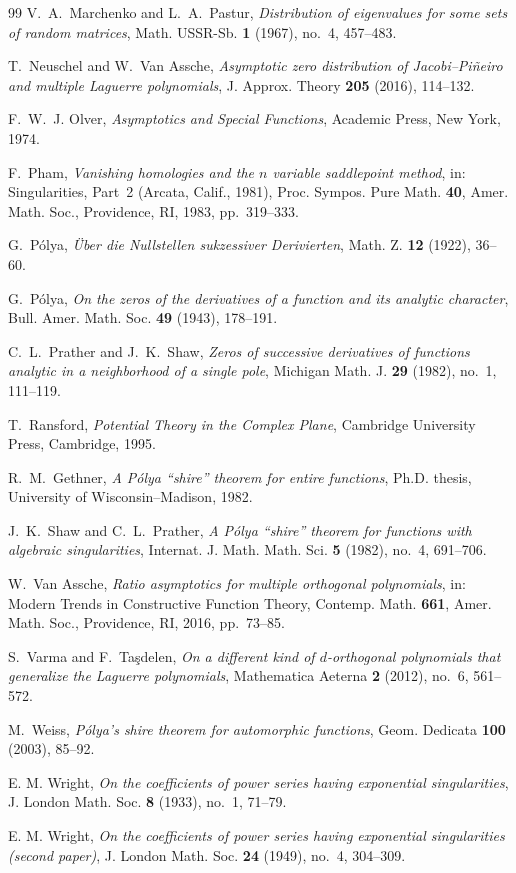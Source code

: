 \documentclass[reqno]{article}
\theoremstyle{definition}
\theoremstyle{remark}
\theoremstyle{plain}
\begin{document}
\begin{thebibliography}{99}
V.~A.~Marchenko and L.~A.~Pastur,
\emph{Distribution of eigenvalues for some sets of random matrices},
Math. USSR-Sb. \textbf{1} (1967), no.~4, 457--483.

T.~Neuschel and W.~Van Assche,
\emph{Asymptotic zero distribution of Jacobi--Pi\~neiro and multiple Laguerre polynomials},
J. Approx. Theory \textbf{205} (2016), 114--132.

F.~W.~J. Olver,
\emph{Asymptotics and Special Functions},
Academic Press, New York, 1974.

F.~Pham,
\emph{Vanishing homologies and the $n$ variable saddlepoint method},
in: Singularities, Part~2 (Arcata, Calif., 1981),
Proc. Sympos. Pure Math. \textbf{40}, Amer. Math. Soc., Providence, RI, 1983, pp.~319--333.

G.~P\'olya,
\emph{\"Uber die Nullstellen sukzessiver Derivierten},
Math. Z. \textbf{12} (1922), 36--60.

G.~P\'olya,
\emph{On the zeros of the derivatives of a function and its analytic character},
Bull. Amer. Math. Soc. \textbf{49} (1943), 178--191.

C.~L.~Prather and J.~K.~Shaw,
\emph{Zeros of successive derivatives of functions analytic in a neighborhood of a single pole},
Michigan Math. J. \textbf{29} (1982), no.~1, 111--119.

T.~Ransford,
\emph{Potential Theory in the Complex Plane},
Cambridge University Press, Cambridge, 1995.

R.~M.~Gethner,
\emph{A P\'olya ``shire'' theorem for entire functions},
Ph.D. thesis, University of Wisconsin--Madison, 1982.

J.~K.~Shaw and C.~L.~Prather,
\emph{A P\'olya ``shire'' theorem for functions with algebraic singularities},
Internat. J. Math. Math. Sci. \textbf{5} (1982), no.~4, 691--706.

W.~Van Assche,
\emph{Ratio asymptotics for multiple orthogonal polynomials},
in: Modern Trends in Constructive Function Theory,
Contemp. Math. \textbf{661}, Amer. Math. Soc., Providence, RI, 2016, pp.~73--85.

S.~Varma and F.~Ta\c{s}delen,
\emph{On a different kind of $d$-orthogonal polynomials that generalize the Laguerre polynomials},
Mathematica Aeterna \textbf{2} (2012), no.~6, 561--572.

M.~Weiss,
\emph{P\'olya's shire theorem for automorphic functions},
Geom. Dedicata \textbf{100} (2003), 85--92.

E. M. Wright,
\emph{On the coefficients of power series having exponential
singularities},
J. London Math. Soc. \textbf{8} (1933), no.~1, 71--79.

E. M. Wright,
\emph{On the coefficients of power series having exponential
singularities (second paper)},
J. London Math. Soc. \textbf{24} (1949), no.~4, 304--309.

\end{thebibliography}
\end{document}
